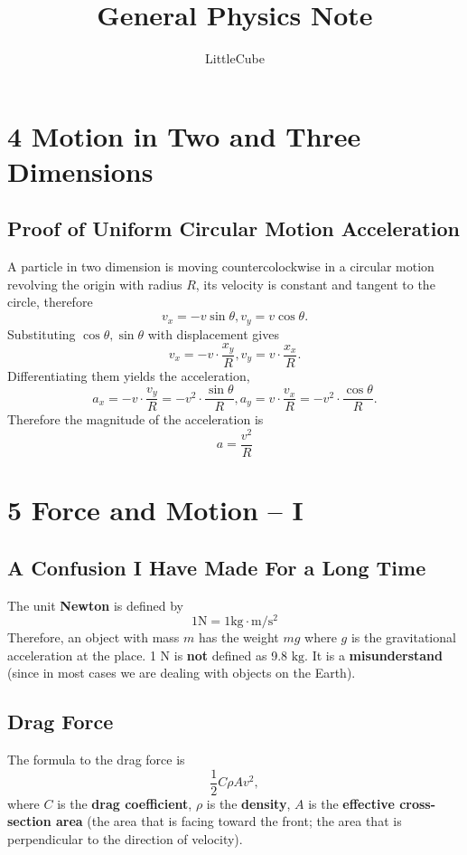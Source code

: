 \documentclass[12pt,a4paper]{report}
\begin{document}
  \title{General Physics Note}
  \author{LittleCube \Huge{}}

  \maketitle

  \section*{4 Motion in Two and Three Dimensions}
  \subsection*{Proof of Uniform Circular Motion Acceleration}
  A particle in two dimension is moving countercolockwise in a circular motion revolving the origin with radius \(R\), its velocity is constant and tangent to the circle, therefore
  \[v_x = - v \sin \theta, v_y = v \cos \theta.\]
  Substituting \(\cos \theta, \sin \theta\) with displacement gives
  \[v_x = - v \cdot \frac{x_y}{R}, v_y = v \cdot \frac{x_x}{R}.\]
  Differentiating them yields the acceleration,
  \[a_x = - v \cdot \frac{v_y}{R} = - v^2 \cdot \frac{\sin \theta}{R}, a_y = v \cdot \frac{v_x}{R} = - v^2 \cdot \frac{\cos \theta}{R}.\]
  Therefore the magnitude of the acceleration is
  \[a = \frac{v^2}{R}\]

  \section*{5 Force and Motion -- I}
  \subsection*{A Confusion I Have Made For a Long Time}

  The unit \textbf{Newton} is defined by
  \[1 \mathrm{N} = 1 \mathrm{kg \cdot m/s^2}\]
  Therefore, an object with mass \(m\) has the weight \(mg\) where \(g\) is the gravitational acceleration at the place.  
  1 \(\mathrm{N}\) is \textbf{not} defined as 9.8 \(\mathrm{kg}\). It is a \textbf{misunderstand} (since in most cases we are dealing with objects on the Earth).
  
  \subsection*{Drag Force}
  The formula to the drag force is
  \[\frac 1 2 C \rho A v^2,\]
  where \(C\) is the \textbf{drag coefficient}, \(\rho\) is the \textbf{density}, \(A\) is the \textbf{effective cross-section area} (the area that is facing toward the front; the area that is perpendicular to the direction of velocity).
\end{document}

